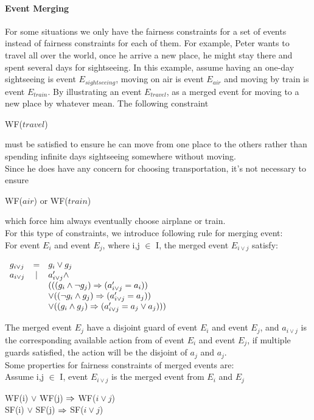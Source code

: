 \paragraph{Event Merging}
For some situations we only have the fairness constraints for a set of events instead of fairness constraints for each of them. For example, Peter wants to travel all over the world, once he arrive a new place, he might stay there and spent several days for sightseeing. In this example, assume having an one-day sightseeing is event $E_{sightseeing}$, moving on air is event $E_{air}$ and moving by train is event $E_{train}$. By illustrating an event $E_{travel}$, as a merged event for moving to a new place by whatever mean. The following constraint
\begin{center}
WF($travel$) 
\end{center}
must be satisfied to ensure he can move from one place to the others rather than spending infinite days sightseeing somewhere without moving.\\
Since he does have any concern for choosing transportation, it's not necessary to ensure
\begin{center}
WF($air$) or WF($train$) 
\end{center}
which force him always eventually choose airplane or train.\\
For this type of constraints, we introduce following rule for merging event:\\
For event $E_{i}$ and event $E_{j}$, where i,j $\in$ I, the merged event $E_{i\lor{j}}$ satisfy:
\begin{center}
$
\begin{array}{lcl}
g_{i\lor{j}} & = & g_{i}\lor{g_{j}}\\
a_{i\lor{j}} & | & a'_{i\lor{j}} \land \\
             &   & (((g_{i}\land\neg{g_{j}})\Rightarrow (a'_{i\lor{j}} = a_{i}))\\
             &   & \lor ((\neg{g_{i}}\land{g_{j}})\Rightarrow (a'_{i\lor{j}} = a_{j}))\\
             &   & \lor (({g_{i}}\land{g_{j}})\Rightarrow (a'_{i\lor{j}} = a_{j}\lor{a_{j}})))
\end{array}
$
\end{center}
The merged event $E_{j}$ have a disjoint guard of event $E_{i}$ and event $E_{j}$, and $a_{i\lor{j}}$ is the corresponding available action from of event $E_{i}$ and event $E_{j}$, if multiple guards satisfied, the action will be the disjoint of $a_{j}$ and ${a_{j}}$. \\
Some properties for fairness constraints of merged events are:\\
Assume i,j $\in$ I, event $E_{i\lor{j}}$ is the merged event from $E_{i}$ and $E_{j}$
\begin{center} 
WF(i) $\lor$ WF(j) $\Rightarrow$  WF($i\lor{j}$)\\
SF(i) $\lor$ SF(j) $\Rightarrow$  SF($i\lor{j}$)
\end{center}
